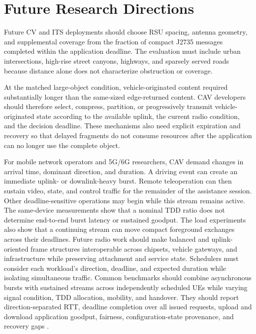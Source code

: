 \section{Future Research Directions}
\label{sec:future-directions}

Future CV and ITS deployments should choose RSU spacing, antenna geometry, and
supplemental coverage from the fraction of compact J2735
messages completed within the application deadline. The evaluation must include urban intersections,
high-rise street canyons, highways, and sparsely served roads because distance
alone does not characterize obstruction or coverage.

At the matched large-object condition, vehicle-originated content required
substantially longer than the same-sized edge-returned content. CAV developers
should therefore select, compress, partition, or progressively transmit
vehicle-originated state according to the available uplink, the current radio
condition, and the decision deadline. These mechanisms also need
explicit expiration and recovery so that delayed fragments do not consume
resources after the application can no longer use the complete object.

For mobile network operators and 5G/6G researchers, CAV demand changes in
arrival time, dominant direction, and duration. A driving event can create an
immediate uplink- or downlink-heavy burst. Remote teleoperation can then sustain
video, state, and control traffic for the remainder of the assistance session.
Other deadline-sensitive operations may begin while this stream remains
active. The same-device measurements show that a nominal TDD ratio does not
determine end-to-end burst latency or sustained goodput. The load experiments
also show that a continuing stream can move compact foreground exchanges across
their deadlines. Future radio work should make balanced and uplink-oriented
frame structures interoperable across chipsets, vehicle gateways, and
infrastructure while preserving attachment and service state. Schedulers must
consider each workload's direction, deadline, and expected duration while
isolating simultaneous traffic. Common benchmarks should combine asynchronous
bursts with sustained streams across independently scheduled UEs while varying
signal condition, TDD allocation, mobility, and handover. They should report
direction-separated RTT, deadline completion over all issued requests, upload
and download application goodput, fairness, configuration-state provenance,
and recovery gaps
\cite{ngmn2021tdd,itu2023m2160}.
